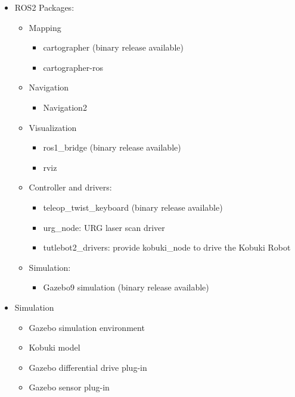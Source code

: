 \documentclass[letterpaper, 10 pt, conference]{ieeeconf}  %
\begin{document}
\begin{itemize}
\item ROS2 Packages:
    \begin{itemize}
        \item Mapping   
            \begin{itemize}
                \item cartographer (binary release available)
                \item cartographer-ros 
            \end{itemize}{}
    \end{itemize}{}
    \begin{itemize}
        \item Navigation
            \begin{itemize}
                \item Navigation2 
            \end{itemize}{}
    \end{itemize}{}
    \begin{itemize}
        \item Visualization
            \begin{itemize}
                \item ros1\_bridge (binary release available)
                \item rviz
            \end{itemize}{}
   
        \item Controller and drivers:
            \begin{itemize}
                \item teleop\_twist\_keyboard (binary release available)
                \item urg\_node: URG laser scan driver 
                \item tutlebot2\_drivers: provide kobuki\_node to drive the Kobuki Robot
            \end{itemize}{}
        \item Simulation:
            \begin{itemize}
                \item Gazebo9 simulation (binary release available)
            \end{itemize}{}
    \end{itemize}{} 
\end{itemize}{}

\begin{itemize}
    \item Simulation 
        \begin{itemize}
            \item Gazebo simulation environment 
            \item Kobuki model 
            \item Gazebo differential drive plug-in  
            \item Gazebo sensor plug-in 
        \end{itemize}{}
\end{itemize}{}
\end{document}
